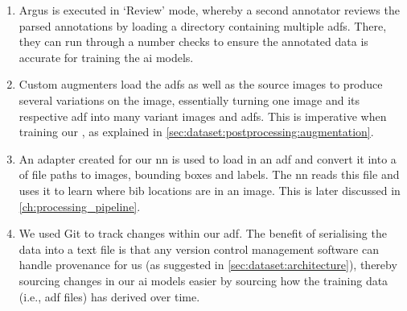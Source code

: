 \begin{enumerate}
  \item Argus is executed in `Review' mode, whereby a second annotator reviews the parsed annotations by loading a directory containing multiple \glspl{adf}. There, they can run through a number checks to ensure the annotated data is accurate for training the \gls{ai} models.
  \item Custom augmenters load the \glspl{adf} as well as the source images to produce several variations on the image, essentially turning one image and its respective \gls{adf} into many variant images and \glspl{adf}. This is imperative when training our , as explained in \cref{sec:dataset:postprocessing:augmentation}.
  \item An adapter created for our \gls{nn} is used to load in an \gls{adf} and convert it into a  of file paths to images, bounding boxes and labels. The \gls{nn} reads this file and uses it to learn where bib locations are in an image. This is later discussed in \cref{ch:processing_pipeline}.
  \item We used Git to track changes within our \gls{adf}. The benefit of serialising the data into a text file is that any version control management software can handle provenance for us (as suggested in \cref{sec:dataset:architecture}), thereby sourcing changes in our \gls{ai} models easier by sourcing how the training data (i.e., \gls{adf} files) has derived over time.
\end{enumerate}





